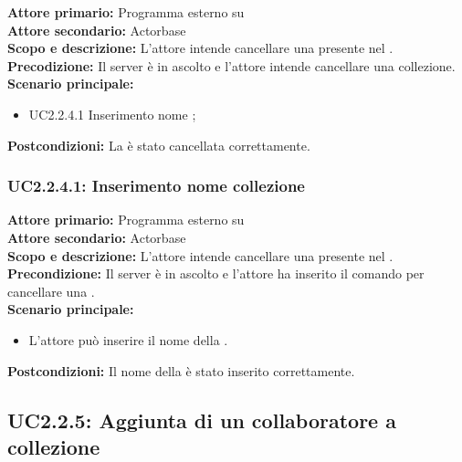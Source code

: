 \documentclass{scalatekids-article}
\begin{document}
\textbf{Attore primario:} Programma esterno su \\
\textbf{Attore secondario:} Actorbase\\
\textbf{Scopo e descrizione:} L'attore intende cancellare una  presente nel .\\
\textbf{Precodizione:} Il server è in ascolto e l'attore intende cancellare una collezione.\\
\textbf{Scenario principale:}
\begin{itemize}
\item UC2.2.4.1 Inserimento nome ;
\end{itemize}
\textbf{Postcondizioni:} La  è stato cancellata correttamente.

\subsubsection{UC2.2.4.1: Inserimento nome collezione}

\textbf{Attore primario:} Programma esterno su \\
\textbf{Attore secondario:} Actorbase\\
\textbf{Scopo e descrizione:} L'attore intende cancellare una  presente nel .\\
\textbf{Precondizione:} Il server è in ascolto e l'attore ha inserito il comando per cancellare una .\\
\textbf{Scenario principale:}
\begin{itemize}
\item L'attore può inserire il nome della .
\end{itemize}
\textbf{Postcondizioni:} Il nome della  è stato inserito correttamente.

\subsection{UC2.2.5: Aggiunta di un collaboratore a collezione}
\end{document}
